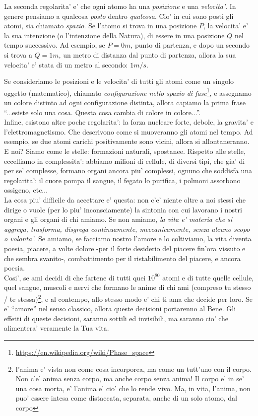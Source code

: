La seconda regolarita' e' che ogni atomo ha una \emph{posizione} e una \emph{velocita'}. In genere pensiamo a qualcosa \emph{posto} dentro \emph{qualcosa}. Cio' in cui sono posti gli atomi, sia chiamato \emph{spazio}. Se l'atomo si trova in una posizione $P$, la velocita' e' la sua intenzione (o l'intenzione della Natura), di essere in una posizione $Q$ nel tempo successivo. Ad esempio, se $P=0m$, punto di partenza, e dopo un secondo si trova a $Q=1m$, un metro di distanza dal punto di partenza, allora la sua velocita' e' stata di un metro al secondo: $1 m/s$.

Se consideriamo le posizioni e le velocita' di tutti gli atomi come un singolo oggetto (matematico), chiamato \emph{configurazione nello spazio di fase}\footnote{\url{https://en.wikipedia.org/wiki/Phase\_space}}, e assegnamo un colore distinto ad ogni configurazione distinta, allora capiamo la prima frase ``...esiste solo una cosa. Questa cosa cambia di colore in colore...''.\\

Infine, esistono altre poche regolarita': la forza nucleare forte, debole, la gravita' e l'elettromagnetismo. Che descrivono come si muoveranno gli atomi nel tempo. Ad esempio, se due atomi carichi positivamente sono vicini, allora si allontaneranno.\\

E noi? Siamo come le stelle: formazioni naturali, spostanee. Rispetto alle stelle, eccelliamo in complessita': abbiamo milioni di cellule, di diversi tipi, che gia' di per se' complesse, formano organi ancora piu' complessi, ognuno che soddisfa una regolarita': il cuore pompa il sangue, il fegato lo purifica, i polmoni assorbono ossigeno, etc...\\

La cosa piu' difficile da accettare e' questa: non c'e' niente oltre a noi stessi che dirige o vuole (per lo piu' inconsciamente) la sintonia con cui lavorano i nostri organi e gli organi di chi amiamo. Se non amiamo, \emph{la vita e' materia che si aggrega, trasforma, disgrega continuamente, meccanicamente, senza alcuno scopo o volonta'}. Se amiamo, se facciamo nostro l'amore e lo coltiviamo, la vita diventa poesia, piacere, a volte dolore -per il forte desiderio del piacere fin'ora vissuto e che sembra svanito-, combattimento per il ristabilimento del piacere, e ancora poesia. \\

Cosi', se ami decidi di che fartene di tutti quei $10^{80}$ atomi e di tutte quelle cellule, quel sangue, muscoli e nervi che formano le anime di chi ami (compreso tu stesso / te stessa)\footnote{l'anima e' vista non come cosa incorporea, ma come un tutt'uno con il corpo. Non c'e' anima senza corpo, ma anche corpo senza anima! Il corpo e' in se' una cosa morta, e' l'anima e' cio' che lo rende vivo. Ma, in vita, l'anima, non puo' essere intesa come distaccata, separata, anche di un solo atomo, dal corpo}, e al contempo, allo stesso modo e' chi ti ama che decide per loro. Se e' ``amore'' nel senso classico, allora queste decisioni portarenno al Bene. Gli effetti di queste decisioni, saranno sottili ed invisibili, ma saranno cio' che alimentera' veramente la Tua vita.\\

